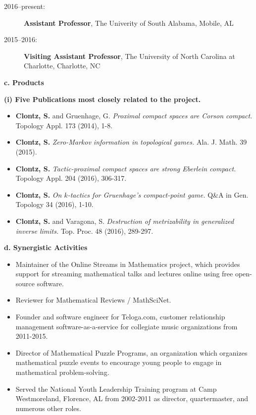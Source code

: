 \begin{description}%
  \item[2016--present:] \textbf{Assistant Professor}, The Univerity of South Alabama, Mobile, AL
  \item[2015--2016:] \textbf{Visiting Assistant Professor}, The University of North Carolina at Charlotte, Charlotte, NC


\end{description}

\noindent\textbf{c. \medskip Products}


\noindent\textbf{(i) Five Publications most closely related to the project.}
\begin{itemize}%

  \item \textbf{Clontz, S.} and Gruenhage, G.
    \textit{Proximal compact spaces are Corson compact.}
    Topology Appl. 173 (2014), 1-8.
  \item \textbf{Clontz, S.}
    \textit{Zero-Markov information in topological games.}
    Ala. J. Math. 39 (2015).
  \item \textbf{Clontz, S.}
    \textit{Tactic-proximal compact spaces are strong Eberlein compact.}
    Topology Appl. 204 (2016), 306-317.
  \item \textbf{Clontz, S.}
    \textit{On \(k\)-tactics for Gruenhage's compact-point game.}
    Q\&A in Gen. Topology 34 (2016), 1-10.
  \item \textbf{Clontz, S.} and Varagona, S.
    \textit{Destruction of metrizability in generalized inverse limits.}
    Top. Proc. 48 (2016), 289-297.


\end{itemize}

\noindent\textbf{d. \medskip Synergistic Activities}

\begin{itemize}%

  \item Maintainer of the Online Streams in Mathematics project, which
  provides support for streaming mathematical talks and lectures online
  using free open-source software.
  \item Reviewer for Mathematical Reviews / MathSciNet.
  \item Founder and software engineer for Teloga.com, customer relationship
        management software-as-a-service for collegiate music organizations
        from 2011-2015.
  \item Director of Mathematical Puzzle Programs, an organization which
        organizes mathematical puzzle events to encourage young people to
        engage in mathematical problem-solving.
  \item Served the National Youth Leadership Training program at Camp Westmoreland,
        Florence, AL from 2002-2011 as director, quartermaster, and
        numerous other roles.




\end{itemize}

